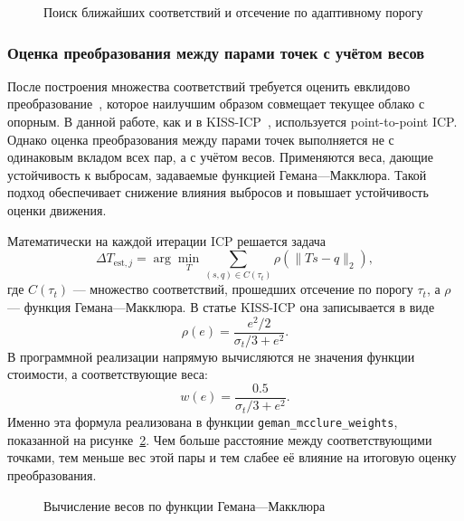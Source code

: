 \begin{figure}
  \fontsize{12pt}{14pt}\selectfont
  
  \caption{Поиск ближайших соответствий и отсечение по адаптивному порогу}
  \label{lst:icp-correspondences}
\end{figure}

\subsubsection{Оценка преобразования между парами точек с учётом весов}

После построения множества соответствий требуется оценить евклидово преобразование~\cite{scipy-rigidtransform}, которое наилучшим образом совмещает текущее облако с опорным. В данной работе, как и в KISS-ICP~\cite{kiss-icp}, используется point-to-point ICP. Однако оценка преобразования между парами точек выполняется не с одинаковым вкладом всех пар, а с учётом весов. Применяются веса, дающие устойчивость к выбросам, задаваемые функцией Гемана---Макклюра. Такой подход обеспечивает снижение влияния выбросов и повышает устойчивость оценки движения.

Математически на каждой итерации ICP решается задача
\begin{equation}
    \Delta T_{\mathrm{est}, j} = \arg\min_T \sum_{(s, q) \in C(\tau_t)} \rho\left(\|Ts - q\|_2\right),
\end{equation}
где \(C(\tau_t)\) --- множество соответствий, прошедших отсечение по порогу \(\tau_t\), а \(\rho\) --- функция Гемана---Макклюра. В статье KISS-ICP она записывается в виде
\begin{equation}
    \rho(e) = \frac{e^2 / 2}{\sigma_t / 3 + e^2}.
\end{equation}
В программной реализации напрямую вычисляются не значения функции стоимости, а соответствующие веса:
\begin{equation}
    w(e) = \frac{0.5}{\sigma_t / 3 + e^2}.
\end{equation}
Именно эта формула реализована в функции \texttt{geman\_mcclure\_weights}, показанной на рисунке~\ref{lst:icp-geman-mcclure}. Чем больше расстояние между соответствующими точками, тем меньше вес этой пары и тем слабее её влияние на итоговую оценку преобразования.

\begin{figure}
  \fontsize{12pt}{14pt}\selectfont
  
  \caption{Вычисление весов по функции Гемана---Макклюра}
  \label{lst:icp-geman-mcclure}
\end{figure}

